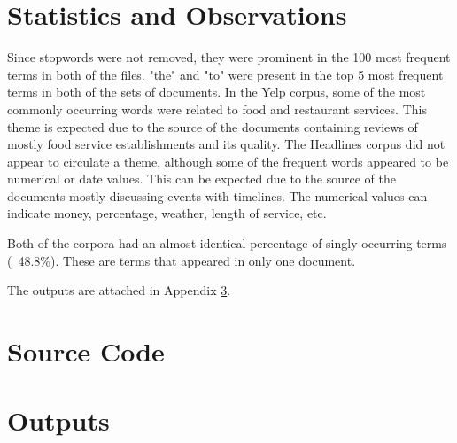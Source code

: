 \documentclass[11pt]{article}
\begin{document}
\section{Statistics and Observations}
Since stopwords were not removed, they were prominent in the 100 most frequent terms in both of the files. "the" and "to" were present in the top 5 most frequent terms in both of the sets of documents. In the Yelp corpus, some of the most commonly occurring words were related to food and restaurant services. This theme is expected due to the source of the documents containing reviews of mostly food service establishments and its quality. The Headlines corpus did not appear to circulate a theme, although some of the frequent words appeared to be numerical or date values. This can be expected due to the source of the documents mostly discussing events with timelines. The numerical values can indicate money, percentage, weather, length of service, etc.

Both of the corpora had an almost identical percentage of singly-occurring terms (~48.8\%). These are terms that appeared in only one document.

The outputs are attached in Appendix \ref{appendix:outputs}.

\appendix

\section{Source Code} \label{appendix:src}



\section{Outputs} \label{appendix:outputs}



\end{document}
